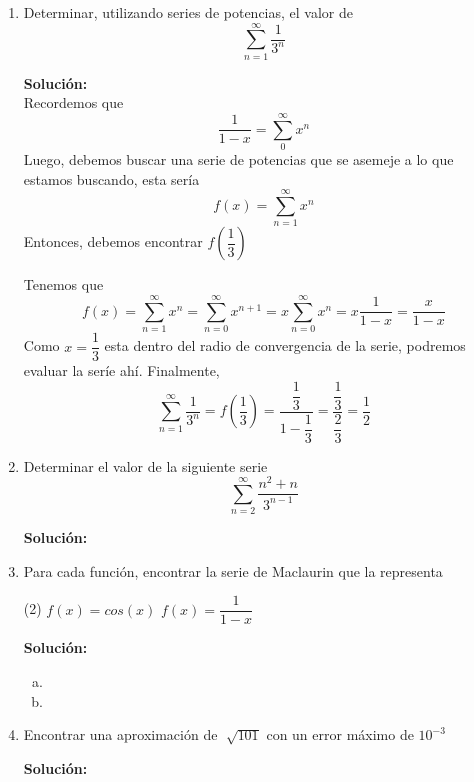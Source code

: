 \documentclass[12pt]{article}
\newenvironment{solucion}
{\begin{mdframed}[backgroundcolor=black!10]
		{\bf Solución:}\\
	}
	{
	\end{mdframed}
}
\newenvironment{preguntas}
{\begin{enumerate}\itemsep12pt
	}
	{
	\end{enumerate}
}
\newcommand{\ra}{\rightarrow}
\begin{document}
\begin{preguntas}
\begin{solucion}
\begin{enumerate}[a)]
		$$f\left(\dfrac{3}{2}\right) = \sum\limits_{n=1}^\infty 0 = 0$$
		Luego,
		$$f\left(\dfrac{3}{2}\right) = -ln(5-3) + c = 0 \ra c = ln(2)$$
		Finalmente,
		$$f(x) = -ln(5-2x) + ln(2) = ln\left(\dfrac{2}{5-2x}\right)$$
\end{enumerate}
\end{solucion}
\item Determinar, utilizando series de potencias, el valor de
	$$\sum\limits_{n=1}^\infty \frac{1}{3^n}$$
\begin{solucion}
Recordemos que $$\dfrac{1}{1-x} = \sum\limits_0^{\infty} x^n$$
		Luego, debemos buscar una serie de potencias que se asemeje a lo que estamos buscando, esta sería
		$$f(x) = \sum\limits_{n=1}^\infty x^{n}$$
		Entonces, debemos encontrar $f\left(\dfrac{1}{3}\right)$
		
		Tenemos que
		$$f(x) 
		= \sum\limits_{n=1}^\infty x^{n} 
		= \sum\limits_{n=0}^\infty x^{n+1}
		= x\sum\limits_{n=0}^\infty x^{n}
		= x \dfrac{1}{1-x}
		= \dfrac{x}{1-x}$$
		Como $x = \dfrac{1}{3}$ esta dentro del radio de convergencia de la serie, podremos evaluar la seríe ahí. Finalmente,
		$$\sum\limits_{n=1}^\infty \frac{1}{3^n} = f\left(\dfrac{1}{3}\right) = \dfrac{\dfrac{1}{3}}{1-\dfrac{1}{3}}
		= \dfrac{\dfrac{1}{3}}{\dfrac{2}{3}} = \dfrac{1}{2}$$
\end{solucion}
\item Determinar el valor de la siguiente serie
	$$ \sum\limits_{n=2}^{\infty}\dfrac{n^2+n}{3^{n-1}} $$
\begin{solucion}

\end{solucion}
\item Para cada función, encontrar la serie de Maclaurin que la representa
\begin{tasks}(2)
\task $f(x) = cos(x)$
\task $f(x) = \dfrac{1}{1-x}$
\end{tasks}
\begin{solucion}

\begin{enumerate}[a)]
\item 
\item 
\end{enumerate}
\end{solucion}
\item Encontrar una aproximación de $\sqrt[]{101}$ con un error máximo de $10^{-3}$
\begin{solucion}

\end{solucion}
\end{preguntas}
\end{document}
